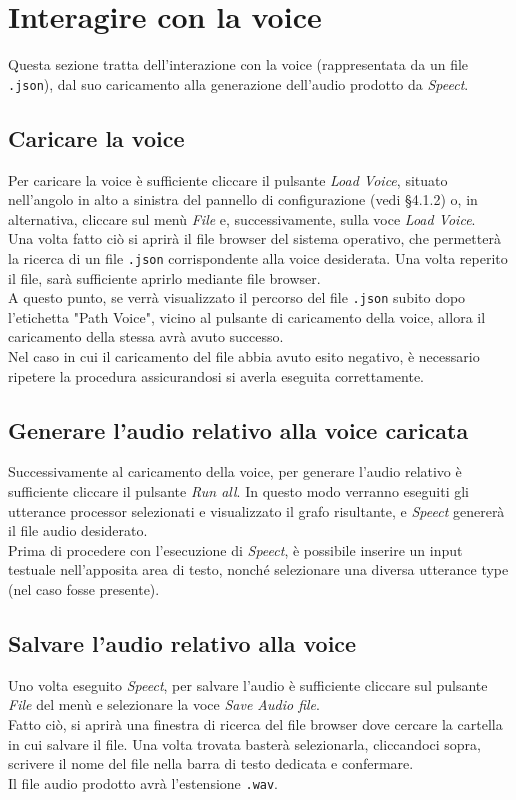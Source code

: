 \documentclass[openany,12pt,a4paper]{report}
\begin{document}
	\section{Interagire con la voice}
	Questa sezione tratta dell'interazione con la voice (rappresentata da un file \verb|.json|), dal suo caricamento alla generazione dell'audio prodotto da \textit{Speect}.
	
	\subsection{Caricare la voice}
	Per caricare la voice è sufficiente cliccare il pulsante \textit{Load Voice}, situato nell'angolo in alto a sinistra del pannello di configurazione (vedi §4.1.2) o, in alternativa, cliccare sul menù \textit{File} e, successivamente, sulla voce \textit{Load Voice}.\\
	Una volta fatto ciò si aprirà il file browser del sistema operativo, che permetterà la ricerca di un file \verb|.json| corrispondente alla voice desiderata. Una volta reperito il file, sarà sufficiente aprirlo mediante file browser.\\
	A questo punto, se verrà visualizzato il percorso del file \verb|.json| subito dopo l'etichetta "Path Voice", vicino al pulsante di caricamento della voice, allora il caricamento della stessa avrà avuto successo.\\
	Nel caso in cui il caricamento del file abbia avuto esito negativo, è necessario ripetere la procedura assicurandosi si averla eseguita correttamente.
	
	\subsection{Generare l'audio relativo alla voice caricata}
	Successivamente al caricamento della voice, per generare l'audio relativo è sufficiente cliccare il pulsante \textit{Run all}. In questo modo verranno eseguiti gli utterance processor selezionati e visualizzato il grafo risultante, e \textit{Speect} genererà il file audio desiderato.\\
	Prima di procedere con l'esecuzione di \textit{Speect}, è possibile inserire un input testuale nell'apposita area di testo, nonché selezionare una diversa utterance type (nel caso fosse presente).
	
	\subsection{Salvare l'audio relativo alla voice}
	Uno volta eseguito \textit{Speect}, per salvare l'audio è sufficiente cliccare sul pulsante \textit{File} del menù e selezionare la voce \textit{Save Audio file}.\\
	Fatto ciò, si aprirà una finestra di ricerca del file browser dove cercare la cartella in cui salvare il file. Una volta trovata basterà selezionarla, cliccandoci sopra, scrivere il nome del file nella barra di testo dedicata e confermare.\\
	Il file audio prodotto avrà l'estensione \verb|.wav|.
	
\end{document}
